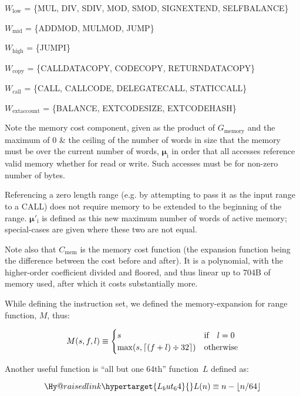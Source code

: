 \documentclass[9pt,oneside]{amsart}
\makeatletter
\newcommand{\linkdest}[1]{\Hy@raisedlink{\hypertarget{#1}{}}}
\DeclarePairedDelimiter{\ceil}{\lceil}{\rceil}
\makeatother
\begin{document}
$W_{\mathrm{low}}$ = \{{\small MUL}, {\small DIV}, {\small SDIV}, {\small MOD}, {\small SMOD}, {\small SIGNEXTEND}, {\small SELFBALANCE}\}

$W_{\mathrm{mid}}$ = \{{\small ADDMOD}, {\small MULMOD}, {\small JUMP}\}

$W_{\mathrm{high}}$ = \{{\small JUMPI}\}

$W_{\mathrm{copy}}$ = \{{\small CALLDATACOPY}, {\small CODECOPY}, {\small RETURNDATACOPY}\}

$W_{\mathrm{call}}$ = \{{\small CALL}, {\small CALLCODE}, {\small DELEGATECALL}, {\small STATICCALL}\}

$W_{\mathrm{extaccount}}$ = \{{\small BALANCE}, {\small EXTCODESIZE}, {\small EXTCODEHASH}\}

Note the memory cost component, given as the product of $G_{\mathrm{memory}}$ and the maximum of 0 \& the ceiling of the number of words in size that the memory must be over the current number of words, $\boldsymbol{\mu}_{\mathrm{i}}$ in order that all accesses reference valid memory whether for read or write. Such accesses must be for non-zero number of bytes.

Referencing a zero length range (e.g. by attempting to pass it as the input range to a CALL) does not require memory to be extended to the beginning of the range. $\boldsymbol{\mu}'_{\mathrm{i}}$ is defined as this new maximum number of words of active memory; special-cases are given where these two are not equal.

Note also that $C_{\mathrm{mem}}$ is the memory cost function (the expansion function being the difference between the cost before and after). It is a polynomial, with the higher-order coefficient divided and floored, and thus linear up to 704B of memory used, after which it costs substantially more.

While defining the instruction set, we defined the memory-expansion for range function, $M$, thus:

\nopagebreak
\begin{equation}
M(s, f, l) \equiv \begin{cases}
s & \text{if} \quad l = 0 \\
\max(s, \ceil{ (f + l) \div 32 }) & \text{otherwise}
\end{cases}
\end{equation}

Another useful function is ``all but one 64th'' function~$L$ defined as:

\begin{equation}
\linkdest{L_but_64}{}
L(n) \equiv n - \lfloor n / 64 \rfloor
\end{equation}
\end{document}
